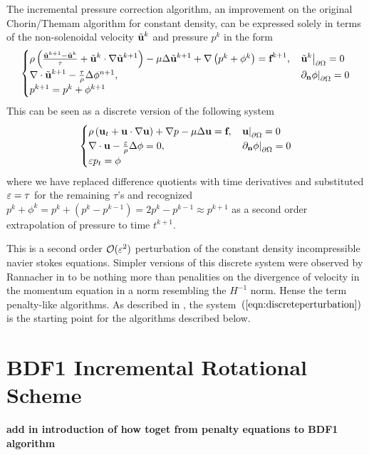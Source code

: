 \documentclass[letterpaper]{erdc}
\begin{document}
The incremental pressure correction algorithm, an improvement on the original Chorin/Themam algorithm for constant density, can be expressed solely in terms of the non-solenoidal velocity $\tilde{\textbf{u}}^{k}$ and pressure $p^{k}$ in the form
\begin{equation}
  \begin{cases}
    \rho\left(\frac{\tilde{\textbf{u}}^{k+1} - \tilde{\textbf{u}}^{k}}{\tau} + \tilde{\textbf{u}}^{k}\cdot\nabla\tilde{\textbf{u}}^{k+1} \right) - \mu\Delta\tilde{\textbf{u}}^{k+1} + \nabla\left(p^{k} + \phi^{k}  \right) = \textbf{f}^{k+1}, & \left.\tilde{\textbf{u}}^{k}\right|_{\partial\Omega} = 0\\
    \nabla\cdot\tilde{\textbf{u}}^{k+1} - \frac{\tau}{\rho}\Delta\phi^{n+1}, &\left.\partial_{\textbf{n}} \phi\right|_{\partial\Omega} = 0\\
    p^{k+1} = p^{k} + \phi^{k+1}
  \end{cases}
\end{equation}
This can be seen as a discrete version of the following system   
\begin{equation}\label{eqn:discreteperturbation}
  \begin{cases}
    \rho\left(\textbf{u}_t + \textbf{u}\cdot\nabla\textbf{u}  \right) + \nabla p -\mu\Delta\textbf{u} = \textbf{f}, & \left.\textbf{u}\right|_{\partial\Omega} = 0\\
    \nabla\cdot\textbf{u} - \frac{\varepsilon}{\rho}\Delta \phi = 0,& \left.\partial_{\textbf{n}} \phi\right|_{\partial\Omega} = 0\\
    \varepsilon p_t = \phi
  \end{cases}
\end{equation}
where we have replaced difference quotients with time derivatives and substituted $\varepsilon = \tau$ for the remaining $\tau$'s and recognized $p^{k} + \phi^{k} = p^{k} + \left( p^{k} - p^{k-1} \right) = 2p^{k} - p^{k-1} \approx p^{k+1}$ as a second order extrapolation of pressure to time $t^{k+1}$.

This is a second order $\mathcal{O}(\varepsilon^2)$ perturbation of the constant density incompressible navier stokes equations.  Simpler versions of this discrete system were observed by Rannacher in \cite{rannacher1992chorin} to be nothing more than penalities on the divergence of velocity in the momentum equation in a norm resembling the $H^{-1}$ norm.  Hense the term penalty-like algorithms.  As described in \cite{guermond2009splitting}, the system~$\left(\ref{eqn:discreteperturbation}\right)$ is the starting point for the algorithms described below.



%
%
%
\section{BDF1 Incremental Rotational Scheme}
\textbf{add in introduction of how toget from penalty equations to BDF1 algorithm}
\end{document}
